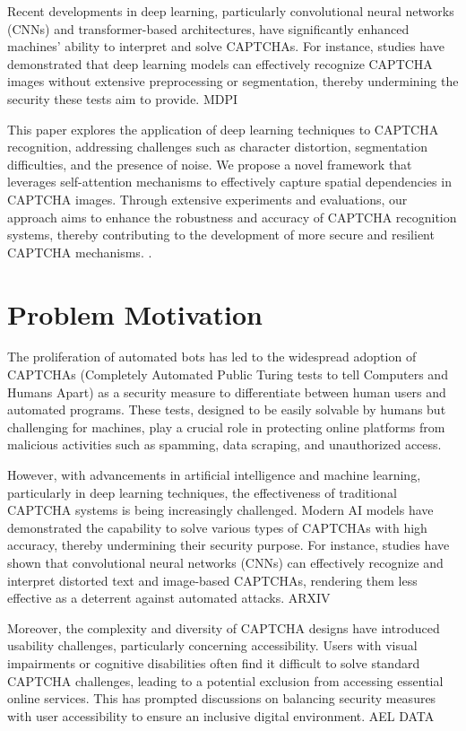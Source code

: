 \documentclass[sigconf]{acmart}
\begin{document}
Recent developments in deep learning, particularly convolutional neural networks (CNNs) and transformer-based architectures, have significantly enhanced machines' ability to interpret and solve CAPTCHAs. For instance, studies have demonstrated that deep learning models can effectively recognize CAPTCHA images without extensive preprocessing or segmentation, thereby undermining the security these tests aim to provide. 
MDPI

This paper explores the application of deep learning techniques to CAPTCHA recognition, addressing challenges such as character distortion, segmentation difficulties, and the presence of noise. We propose a novel framework that leverages self-attention mechanisms to effectively capture spatial dependencies in CAPTCHA images. Through extensive experiments and evaluations, our approach aims to enhance the robustness and accuracy of CAPTCHA recognition systems, thereby contributing to the development of more secure and resilient CAPTCHA mechanisms.
.

\section{Problem Motivation}
The proliferation of automated bots has led to the widespread adoption of CAPTCHAs (Completely Automated Public Turing tests to tell Computers and Humans Apart) as a security measure to differentiate between human users and automated programs. These tests, designed to be easily solvable by humans but challenging for machines, play a crucial role in protecting online platforms from malicious activities such as spamming, data scraping, and unauthorized access.

However, with advancements in artificial intelligence and machine learning, particularly in deep learning techniques, the effectiveness of traditional CAPTCHA systems is being increasingly challenged. Modern AI models have demonstrated the capability to solve various types of CAPTCHAs with high accuracy, thereby undermining their security purpose. For instance, studies have shown that convolutional neural networks (CNNs) can effectively recognize and interpret distorted text and image-based CAPTCHAs, rendering them less effective as a deterrent against automated attacks. 
ARXIV

Moreover, the complexity and diversity of CAPTCHA designs have introduced usability challenges, particularly concerning accessibility. Users with visual impairments or cognitive disabilities often find it difficult to solve standard CAPTCHA challenges, leading to a potential exclusion from accessing essential online services. This has prompted discussions on balancing security measures with user accessibility to ensure an inclusive digital environment. 
AEL DATA
\end{document}
